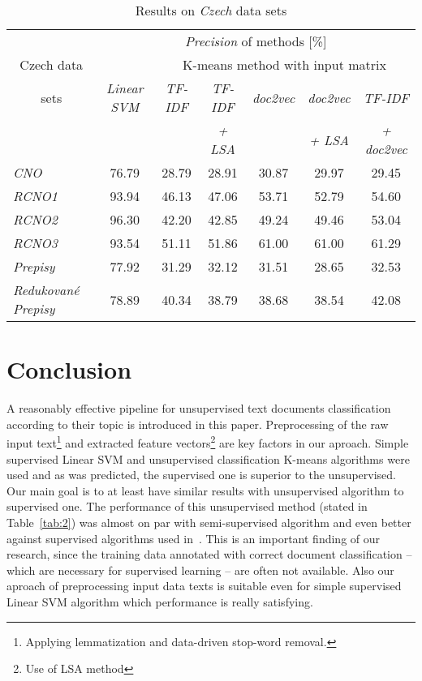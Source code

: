 \documentclass[runningheads,a4paper]{llncs}
\begin{document}
\begin{table}[]
\centering
\caption[Data]{Results on \emph{Czech} data sets}
\label{tab:3}
\begin{tabular}{|l||c||c|c|c|c|c|}
\hline
& \multicolumn{6}{c|}{\emph{Precision} of methods [\%]} \\ \cline{2-7}
\multicolumn{1}{|c||}{Czech data} & & \multicolumn{5}{c|}{K-means method with input matrix} \\ \cline{3-7}
\multicolumn{1}{|c||}{sets} & \emph{Linear SVM} & \emph{TF-IDF} & \emph{TF-IDF} & \emph{doc2vec} &  \emph{doc2vec} &  \emph{TF-IDF}\\ 
 &  &  & \emph{+ LSA} & & \emph{+ LSA} & \emph{+ doc2vec} \\  \hline \hline
\emph{CNO}     					& 76.79 & 28.79 & 28.91 & 30.87 & 29.97 & 29.45 \\ \hline 
\emph{RCNO1}     	& 93.94 & 46.13 & 47.06 & 53.71 & 52.79 & 54.60 \\ \hline
\emph{RCNO2}     	& 96.30 & 42.20 & 42.85 & 49.24 & 49.46 & 53.04 \\ \hline
\emph{RCNO3}     	& 93.54 & 51.11 & 51.86 & 61.00 & 61.00 & 61.29 \\ \hline \hline

\emph{Prepisy} 					& 77.92 & 31.29 & 32.12 & 31.51 & 28.65 & 32.53 \\ \hline
\emph{Redukované Prepisy} 		& 78.89 & 40.34 & 38.79 & 38.68 & 38.54 & 42.08 \\ \hline

\end{tabular}
\end{table}


\section{Conclusion}
\label{sec:conclusion}
A reasonably effective pipeline for unsupervised text documents classification according to their topic is introduced in this paper. Preprocessing of the raw input text\footnote{Applying lemmatization and data-driven stop-word removal.} and extracted feature vectors\footnote{Use of LSA method} are key factors in our aproach. Simple supervised Linear SVM and unsupervised classification K-means algorithms were used and as was predicted, the supervised one is superior to the unsupervised. Our main goal is to at least have similar results with unsupervised algorithm to supervised one. The performance of this unsupervised method (stated in Table~\ref{tab:2}) was almost on par with semi-supervised algorithm and even better against supervised algorithms used in~\cite{chinniyan2017semantic}. This is an important finding of our research, since the training data annotated with correct document classification -- which are necessary for supervised learning -- are often not available. Also our aproach of preprocessing input data texts is suitable even for simple supervised Linear SVM algorithm which performance is really satisfying.



%

\end{document}
